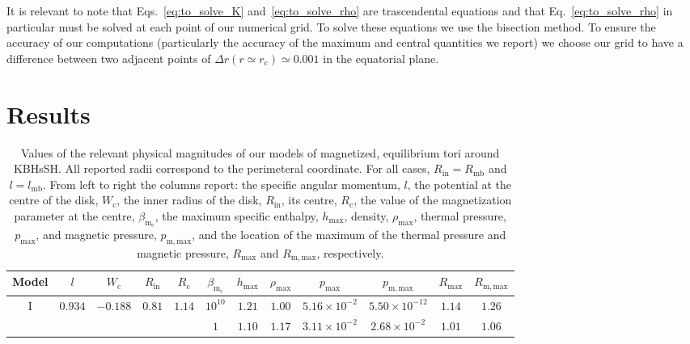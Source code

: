\documentclass[twocolumn,aps,showpacs,showkeys,prd,superscriptaddress,byrevtex, amsmath]{revtex4-1}
\begin{document}
It is relevant to note that Eqs.~\eqref{eq:to_solve_K} and~\eqref{eq:to_solve_rho} are trascendental equations and that Eq.~\eqref{eq:to_solve_rho} in particular must be solved at each point of our numerical grid. To solve these equations we use the bisection method. To ensure the accuracy of our computations (particularly the accuracy of the maximum and central quantities we report) we choose our grid to have a difference between two adjacent points of $\Delta r (r \simeq r_{\mathrm{c}}) \simeq 0.001$ in the equatorial plane.

\section{Results}
\label{results}

\begin{table*}[t]
\caption{Values of the relevant physical magnitudes of our models of magnetized, equilibrium tori around KBHsSH. All reported radii correspond to the perimeteral coordinate. For all cases,  $R_{\mathrm{in}} = R_{\mathrm{mb}}$ and $l = l_{\mathrm{mb}}$. From left to right the columns report: the specific angular momentum, $l$, the potential at the centre of the disk, $W_{\mathrm{c}}$, the inner radius of the disk, $R_{\mathrm{in}}$, its centre, $R_{\mathrm{c}}$, the value of the magnetization parameter at the centre, $\beta_{\mathrm{m_{\mathrm{c}}}}$, the maximum specific enthalpy, $h_{\mathrm{max}}$, density,  $\rho_{\mathrm{max}}$, thermal pressure, $p_{\mathrm{max}}$, and magnetic pressure, $p_{\mathrm{m, max}}$, and the location of the maximum of the thermal pressure and magnetic pressure, $R_{\mathrm{max}}$ and $R_{\mathrm{m, max}}$, respectively.}       
\label{HBH_disk_parameters}      
\centering          
\begin{tabular}{c c c c c  c c c c c c c}
\hline\hline       
 Model & $l$ & $W_{\mathrm{c}}$ & $R_{\mathrm{in}}$ & $R_{\mathrm{c}}$ &  $\beta_{\mathrm{m_{\mathrm{c}}}}$ & $h_{\mathrm{max}}$ & $\rho_{\mathrm{max}}$ & $p_{\mathrm{max}}$ & $p_{\mathrm{m, max}}$ & $R_{\mathrm{max}}$ & $R_{\mathrm{m, max}}$\\ 
\hline           
I & $0.934$ & $-0.188$ & $0.81$ & $1.14$ & $10^{10}$ & $1.21$ & $1.00$ & $5.16 \times 10^{-2}$ & $5.50 \times 10^{-12}$ & $1.14$ & $1.26$\\ 

 &  &  &  &  & $1$ & $1.10$ & $1.17$ & $3.11 \times 10^{-2}$ & $2.68 \times 10^{-2}$ & $1.01$ & $1.06$\\ 


\end{tabular}
\end{table*}
\end{document}
